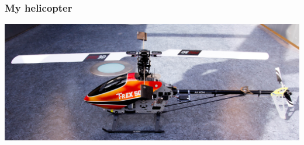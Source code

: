 \documentclass{beamer}
\begin{document}
\begin{frame}
\frametitle{My helicopter}

\begin{center}
	\includegraphics[width=\textwidth]{images/IMG_0618_cropped_smaller}
\end{center}

\end{frame}

%
%
%
\end{document}
